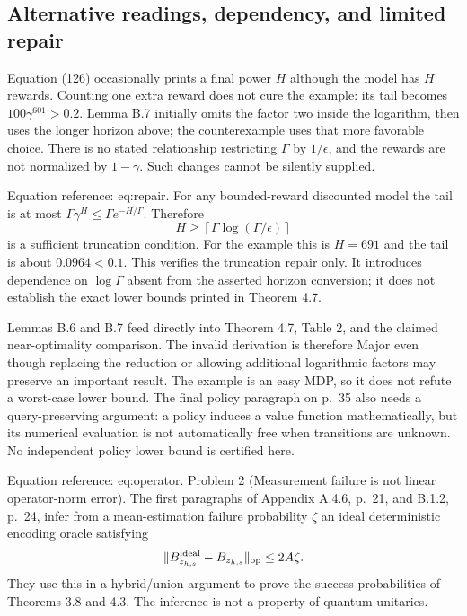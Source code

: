 \documentclass[10pt]{article}
\begin{document}
\subsection*{Alternative readings, dependency, and limited repair}
Equation (126) occasionally prints a final power \(H\) although the model has \(H\) rewards. Counting one extra reward does not cure the example: its tail becomes \(100\gamma^{601}>0.2\). Lemma B.7 initially omits the factor two inside the logarithm, then uses the longer horizon above; the counterexample uses that more favorable choice. There is no stated relationship restricting \(\Gamma\) by \(1/\epsilon\), and the rewards are not normalized by \(1-\gamma\). Such changes cannot be silently supplied.\par
Equation reference: eq:repair. For any bounded-reward discounted model the tail is at most \(\Gamma\gamma^H\leq\Gamma e^{-H/\Gamma}\). Therefore \[
H\geq\left\lceil\Gamma\log(\Gamma/\epsilon)\right\rceil\] is a sufficient truncation condition. For the example this is \(H=691\) and the tail is about \(0.0964<0.1\). This verifies the truncation repair only. It introduces dependence on \(\log\Gamma\) absent from the asserted horizon conversion; it does not establish the exact lower bounds printed in Theorem 4.7.\par
Lemmas B.6 and B.7 feed directly into Theorem 4.7, Table 2, and the claimed near-optimality comparison. The invalid derivation is therefore Major even though replacing the reduction or allowing additional logarithmic factors may preserve an important result. The example is an easy MDP, so it does not refute a worst-case lower bound. The final policy paragraph on p. 35 also needs a query-preserving argument: a policy induces a value function mathematically, but its numerical evaluation is not automatically free when transitions are unknown. No independent policy lower bound is certified here.\par
Equation reference: eq:operator. Problem 2 (Measurement failure is not linear operator-norm error).  The first paragraphs of Appendix A.4.6, p. 21, and B.1.2, p. 24, infer from a mean-estimation failure probability \(\zeta\) an ideal deterministic encoding oracle satisfying \[
\|B^{\rm ideal}_{z_{h,s}}-B_{z_{h,s}}\|_{\rm op}\leq2A\zeta.\] They use this in a hybrid/union argument to prove the success probabilities of Theorems 3.8 and 4.3. The inference is not a property of quantum unitaries.\par
\end{document}
